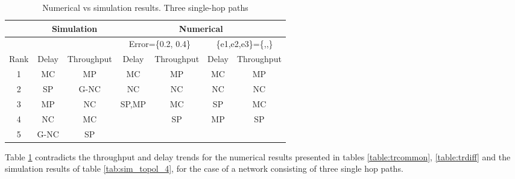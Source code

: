 \documentclass[journal, onecolumn, 12pt]{IEEEtran}
\begin{document}
\begin{table}[h]
\begin{center}
\scriptsize
\begin{tabular}{|c|c|c|c|c|c|c|}
\hline
     & \multicolumn{2}{|c|}{Simulation}     & \multicolumn{4}{|c|}{Numerical}                                   \\ \hline
     & \multicolumn{2}{|c|}{} & \multicolumn{2}{|c|}{ Error=\{0.2, 0.4\}} & \multicolumn{2}{|c|}{ \{e1,e2,e3\}=\{,,\} }\\ \hline
Rank & Delay               & Throughput              &  Delay           & Throughput  &  Delay           & Throughput          \\ \hline
1    & MC                 & MP                & MC              & MP   &  MC & MP      \\ \hline
2    & SP                 & G-NC                & NC              & NC & NC & NC  \\ \hline
3    & MP                & NC                & SP,MP              & MC &  SP & MC  \\ \hline
4    & NC                 & MC                &               & SP & MP & SP  \\ \hline
5    & G-NC                 & SP                &               &   &  &    \\ \hline
\end{tabular}
\end{center}
\caption{Numerical vs simulation results. Three single-hop paths}
\label{tab:comp_3}
\end{table}

Table \ref{tab:comp_3} contradicts the throughput and delay trends for the numerical results presented in tables \ref{table:trcommon}, \ref{table:trdiff} and the simulation results of table \ref{tab:sim_topol_4},
for the case of a network consisting of three single hop paths.
\end{document}
